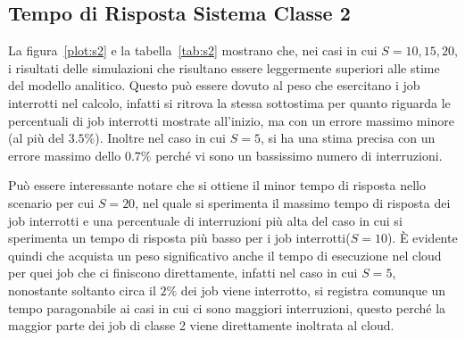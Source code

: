 \subsection{Tempo di Risposta Sistema Classe 2}
La figura~\ref{plot:s2} e la tabella~\ref{tab:s2} mostrano che, nei casi in cui
$S=10,15,20$, i risultati delle simulazioni che risultano essere leggermente
superiori alle stime del modello analitico. Questo può essere dovuto
al peso che esercitano i job interrotti nel calcolo, infatti si ritrova la
stessa sottostima per quanto riguarda le percentuali di job interrotti
mostrate all'inizio, ma con un errore massimo minore (al più del $3.5\%$).
Inoltre nel caso in cui $S=5$, si ha una stima precisa con un errore massimo
dello $0.7\%$ perché vi sono un bassissimo numero di interruzioni.

Può essere interessante notare che si ottiene il minor tempo di risposta nello
scenario per cui $S=20$, nel quale si sperimenta il massimo tempo di risposta
dei job interrotti e una percentuale di interruzioni più alta del caso in cui si
sperimenta un tempo di risposta più basso per i job interrotti($S=10$). È
evidente quindi che acquista un peso significativo anche il tempo di esecuzione
nel cloud per quei job che ci finiscono direttamente, infatti nel caso in cui
$S=5$, nonostante soltanto circa il $2\%$ dei job viene interrotto, si registra
comunque un tempo paragonabile ai casi in cui ci sono maggiori interruzioni,
questo perché la maggior parte dei job di classe 2 viene direttamente inoltrata
al cloud.
